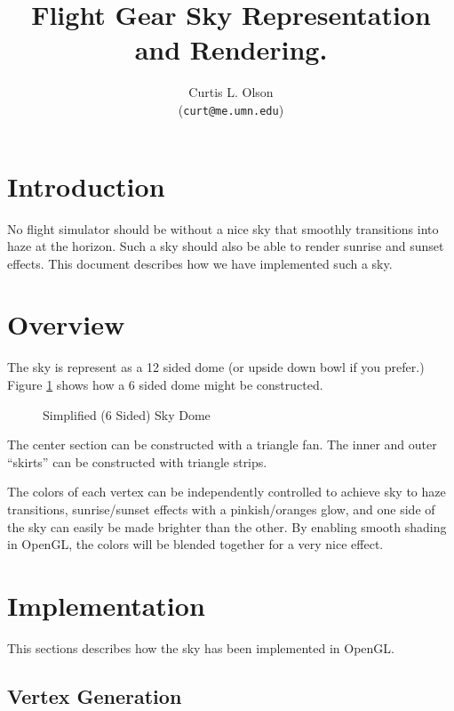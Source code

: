 \documentclass[12pt]{article}
\begin{document}
\title{
  Flight Gear Sky Representation and Rendering.
}


\author{
    Curtis L. Olson\\ 
    (\texttt{curt@me.umn.edu})
}


\maketitle


\section{Introduction}

No flight simulator should be without a nice sky that smoothly
transitions into haze at the horizon.  Such a sky should also be able
to render sunrise and sunset effects.  This document describes how we
have implemented such a sky.

\section{Overview}

The sky is represent as a 12 sided dome (or upside down bowl if you
prefer.)  Figure \ref{fig:dome} shows how a 6 sided dome might be
constructed.

\begin{figure}[hbt]
  \centerline{                   
  }
  \caption{Simplified (6 Sided) Sky Dome}
  \label{fig:dome}
\end{figure}

The center section can be constructed with a triangle fan.  The inner
and outer ``skirts'' can be constructed with triangle strips.

The colors of each vertex can be independently controlled to achieve
sky to haze transitions, sunrise/sunset effects with a pinkish/oranges
glow, and one side of the sky can easily be made brighter than the
other.  By enabling smooth shading in OpenGL, the colors will be
blended together for a very nice effect.


\section{Implementation}

This sections describes how the sky has been implemented in OpenGL.

\subsection{Vertex Generation}
\end{document}
